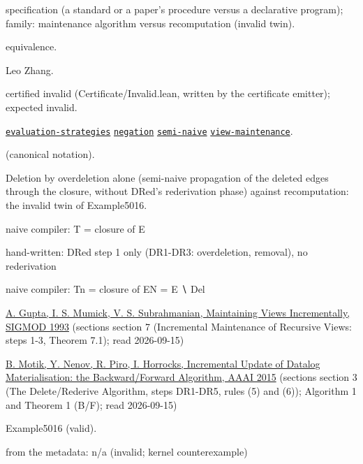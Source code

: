 \documentclass[10pt]{article}
\begin{document}
\begin{description}[leftmargin=2.6cm,style=nextline,itemsep=1pt]

\item[Category] specification (a standard or a paper's procedure versus a declarative program); family: maintenance algorithm versus recomputation (invalid twin).

\item[Kind] equivalence.

\item[Contributors] Leo Zhang.

\item[Status] certified invalid (Certificate/Invalid.lean, written by the certificate emitter); expected invalid.

\item[Tags] \hyperref[tag:evaluation-strategies]{\texttt{evaluation-strategies}} \hyperref[tag:negation]{\texttt{negation}} \hyperref[tag:semi-naive]{\texttt{semi-naive}} \hyperref[tag:view-maintenance]{\texttt{view-maintenance}}.

\item[Input]  (canonical notation).

\item[Summary] Deletion by overdeletion alone (semi-naive propagation of the deleted edges through the closure, without DRed's rederivation phase) against recomputation: the invalid twin of Example5016.

\item[Sides] naive compiler: T = closure of E \par hand-written: DRed step 1 only (DR1-DR3: overdeletion, removal), no rederivation \par naive compiler: Tn = closure of EN = E ∖ Del

\item[Sources] {\raggedright \href{https://doi.org/10.1145/170035.170066}{A. Gupta, I. S. Mumick, V. S. Subrahmanian, Maintaining Views Incrementally, SIGMOD 1993} (sections section 7 (Incremental Maintenance of Recursive Views: steps 1-3, Theorem 7.1); read 2026-09-15) \par \href{https://doi.org/10.1609/aaai.v29i1.9409}{B. Motik, Y. Nenov, R. Piro, I. Horrocks, Incremental Update of Datalog Materialisation: the Backward/Forward Algorithm, AAAI 2015} (sections section 3 (The Delete/Rederive Algorithm, steps DR1-DR5, rules (5) and (6)); Algorithm 1 and Theorem 1 (B/F); read 2026-09-15)\par}

\item[Twin] Example5016 (valid).

\item[Obstruction note] from the metadata: n/a (invalid; kernel counterexample)

\end{description}
\end{document}
